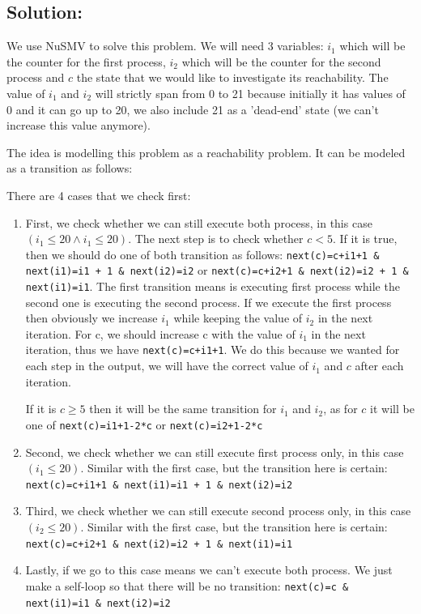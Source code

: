 \documentclass[12pt]{article}
\begin{document}
\subsection*{Solution:}
We use NuSMV to solve this problem. We will need 3 variables: $i_1$ which will be the counter for the first process, $i_2$ which will be the counter for the second process and $c$ the state that we would like to investigate its reachability. The value of $i_1$ and $i_2$ will strictly span from 0 to 21 because initially it has values of 0 and it can go up to 20, we also include 21 as a 'dead-end' state (we can't increase this value anymore).

The idea is modelling this problem as a reachability problem. It can be modeled as a transition as follows:

There are 4 cases that we check first: 
\begin{enumerate}
	\item First, we check whether we can still execute both process, in this case $(i_1 \leq 20 \wedge i_1 \leq 20)$. The next step is to check whether $c < 5$. If it is true, then we should do one of both transition as follows: {\tt next(c)=c+i1+1 \& next(i1)=i1 + 1 \& next(i2)=i2} or {\tt next(c)=c+i2+1 \& next(i2)=i2 + 1 \& next(i1)=i1}. The first transition means is executing first process while the second one is executing the second process. If we execute the first process then obviously we increase $i_1$ while keeping the value of $i_2$ in the next iteration. For c, we should increase c with the value of $i_1$ in the next iteration, thus we have {\tt next(c)=c+i1+1}. We do this because we wanted for each step in the output, we will have the correct value of $i_1$ and $c$ after each iteration.
	
	If it is $c \geq 5$ then it will be the same transition for $i_1$ and $i_2$, as for $c$ it will be one of  {\tt next(c)=i1+1-2*c} or {\tt next(c)=i2+1-2*c}
	\item Second, we check whether we can still execute first process only, in this case $(i_1 \leq 20)$. Similar with the first case, but the transition here is certain: {\tt next(c)=c+i1+1 \& next(i1)=i1 + 1 \& next(i2)=i2}
	\item Third, we check whether we can still execute second process only, in this case $(i_2 \leq 20)$. Similar with the first case, but the transition here is certain: {\tt next(c)=c+i2+1 \& next(i2)=i2 + 1 \& next(i1)=i1}
	\item Lastly, if we go to this case means we can't execute both process. We just make a self-loop so that there will be no transition: {\tt next(c)=c \& next(i1)=i1 \& next(i2)=i2}
	
\end{enumerate}
\end{document}
